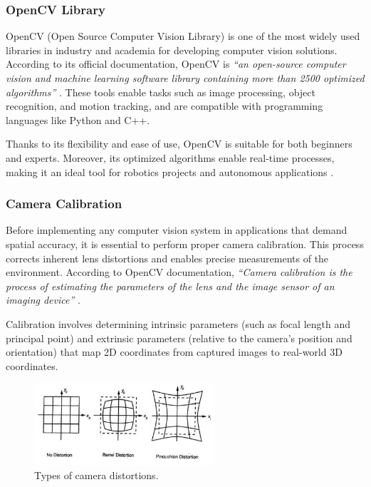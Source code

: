     \subsubsection{OpenCV Library}
    
    OpenCV (Open Source Computer Vision Library) is one of the most widely used libraries in industry and academia for developing computer vision solutions. According to its official documentation, OpenCV is \textit{“an open-source computer vision and machine learning software library containing more than 2500 optimized algorithms”} \cite{opencv_docs}. These tools enable tasks such as image processing, object recognition, and motion tracking, and are compatible with programming languages like Python and C++.  
    
    Thanks to its flexibility and ease of use, OpenCV is suitable for both beginners and experts. Moreover, its optimized algorithms enable real-time processes, making it an ideal tool for robotics projects and autonomous applications \cite{opencv_docs}.  
    
    \subsubsection{Camera Calibration}
    
    Before implementing any computer vision system in applications that demand spatial accuracy, it is essential to perform proper camera calibration. This process corrects inherent lens distortions and enables precise measurements of the environment. According to OpenCV documentation, \textit{“Camera calibration is the process of estimating the parameters of the lens and the image sensor of an imaging device”} \cite{opencv_calib3d}.  
    
    Calibration involves determining intrinsic parameters (such as focal length and principal point) and extrinsic parameters (relative to the camera's position and orientation) that map 2D coordinates from captured images to real-world 3D coordinates.  
    
    \begin{figure}[h!] 
        \centering 
        \includegraphics[width=0.6\textwidth]{pictures/distortions.png} %
        \caption{Types of camera distortions.} 
        \label{fig:distortions} 
    \end{figure}  
    
